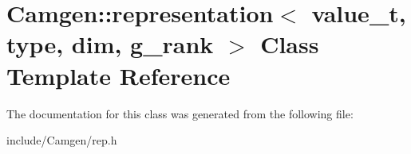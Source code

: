 \hypertarget{a00474}{}\section{Camgen\+:\+:representation$<$ value\+\_\+t, type, dim, g\+\_\+rank $>$ Class Template Reference}
\label{a00474}


The documentation for this class was generated from the following file\+:\begin{DoxyCompactItemize}
\item 
include/\+Camgen/rep.\+h\end{DoxyCompactItemize}

